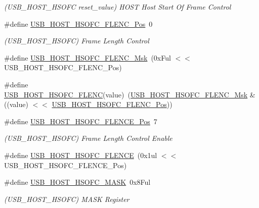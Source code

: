 \begin{DoxyCompactItemize}
\begin{DoxyCompactList}\small\item\em (U\+S\+B\+\_\+\+H\+O\+S\+T\+\_\+\+H\+S\+O\+FC reset\+\_\+value) H\+O\+ST Host Start Of Frame Control \end{DoxyCompactList}\item 
\#define \mbox{\hyperlink{group___s_a_m_d21___u_s_b_gaa7d764b82c769e5fba6b45dc17587826}{U\+S\+B\+\_\+\+H\+O\+S\+T\+\_\+\+H\+S\+O\+F\+C\+\_\+\+F\+L\+E\+N\+C\+\_\+\+Pos}}~0
\begin{DoxyCompactList}\small\item\em (U\+S\+B\+\_\+\+H\+O\+S\+T\+\_\+\+H\+S\+O\+FC) Frame Length Control \end{DoxyCompactList}\item 
\#define \mbox{\hyperlink{group___s_a_m_d21___u_s_b_gac1829acae3cf0d9c38208fdf50ae71e1}{U\+S\+B\+\_\+\+H\+O\+S\+T\+\_\+\+H\+S\+O\+F\+C\+\_\+\+F\+L\+E\+N\+C\+\_\+\+Msk}}~(0x\+Ful $<$$<$ U\+S\+B\+\_\+\+H\+O\+S\+T\+\_\+\+H\+S\+O\+F\+C\+\_\+\+F\+L\+E\+N\+C\+\_\+\+Pos)
\item 
\#define \mbox{\hyperlink{group___s_a_m_d21___u_s_b_gaffe516be7c47311e5a0c55ba0e069053}{U\+S\+B\+\_\+\+H\+O\+S\+T\+\_\+\+H\+S\+O\+F\+C\+\_\+\+F\+L\+E\+NC}}(value)~(\mbox{\hyperlink{group___s_a_m_d21___u_s_b_gac1829acae3cf0d9c38208fdf50ae71e1}{U\+S\+B\+\_\+\+H\+O\+S\+T\+\_\+\+H\+S\+O\+F\+C\+\_\+\+F\+L\+E\+N\+C\+\_\+\+Msk}} \& ((value) $<$$<$ \mbox{\hyperlink{group___s_a_m_d21___u_s_b_gaa7d764b82c769e5fba6b45dc17587826}{U\+S\+B\+\_\+\+H\+O\+S\+T\+\_\+\+H\+S\+O\+F\+C\+\_\+\+F\+L\+E\+N\+C\+\_\+\+Pos}}))
\item 
\#define \mbox{\hyperlink{group___s_a_m_d21___u_s_b_ga7f3fe2713c71363a782be75f4f90a0c0}{U\+S\+B\+\_\+\+H\+O\+S\+T\+\_\+\+H\+S\+O\+F\+C\+\_\+\+F\+L\+E\+N\+C\+E\+\_\+\+Pos}}~7
\begin{DoxyCompactList}\small\item\em (U\+S\+B\+\_\+\+H\+O\+S\+T\+\_\+\+H\+S\+O\+FC) Frame Length Control Enable \end{DoxyCompactList}\item 
\#define \mbox{\hyperlink{group___s_a_m_d21___u_s_b_gabf578f7db74f789fcf32027a2a905503}{U\+S\+B\+\_\+\+H\+O\+S\+T\+\_\+\+H\+S\+O\+F\+C\+\_\+\+F\+L\+E\+N\+CE}}~(0x1ul $<$$<$ U\+S\+B\+\_\+\+H\+O\+S\+T\+\_\+\+H\+S\+O\+F\+C\+\_\+\+F\+L\+E\+N\+C\+E\+\_\+\+Pos)
\item 
\#define \mbox{\hyperlink{group___s_a_m_d21___u_s_b_gaf620d1f4e2ddb86529c1f7a029defbca}{U\+S\+B\+\_\+\+H\+O\+S\+T\+\_\+\+H\+S\+O\+F\+C\+\_\+\+M\+A\+SK}}~0x8\+Ful
\begin{DoxyCompactList}\small\item\em (U\+S\+B\+\_\+\+H\+O\+S\+T\+\_\+\+H\+S\+O\+FC) M\+A\+SK Register \end{DoxyCompactList}\item 
$$
\end{DoxyCompactItemize}
